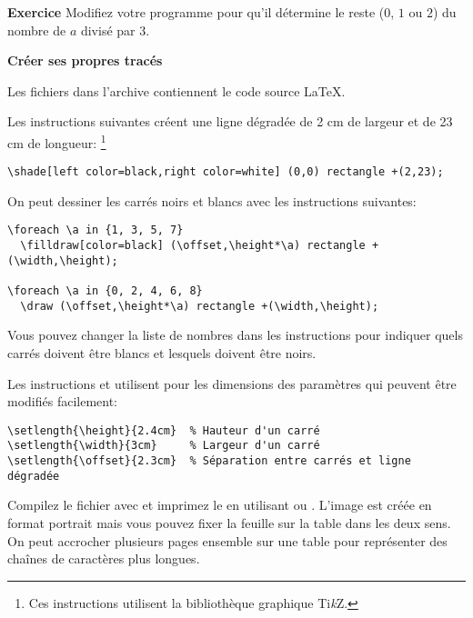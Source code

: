\textbf{Exercice}
Modifiez votre programme pour qu'il détermine le reste ($0$, $1$ ou $2$)
du nombre de $a$ divisé par $3$.

\bigskip

\textbf{Créer ses propres tracés}


Les fichiers  dans l'archive contiennent le code source \LaTeX{}.

Les instructions suivantes créent une ligne dégradée de 2 cm de largeur et de 23 cm de longueur:
\footnote{Ces instructions utilisent la bibliothèque graphique Ti\textit{k}Z.}
\begin{footnotesize}
\begin{verbatim}
\shade[left color=black,right color=white] (0,0) rectangle +(2,23);
\end{verbatim}
\end{footnotesize}

On peut dessiner les carrés noirs et blancs avec les instructions suivantes:
\begin{footnotesize}
\begin{verbatim}
\foreach \a in {1, 3, 5, 7}
  \filldraw[color=black] (\offset,\height*\a) rectangle +(\width,\height);

\foreach \a in {0, 2, 4, 6, 8}
  \draw (\offset,\height*\a) rectangle +(\width,\height);
\end{verbatim}
\end{footnotesize}

Vous pouvez changer la liste de nombres dans les instructions 
pour indiquer quels carrés doivent être blancs et lesquels doivent être noirs.

Les instructions  et  utilisent pour les dimensions des paramètres
qui peuvent être modifiés facilement:
\begin{footnotesize}
\begin{verbatim}
\setlength{\height}{2.4cm}  % Hauteur d'un carré
\setlength{\width}{3cm}     % Largeur d'un carré
\setlength{\offset}{2.3cm}  % Séparation entre carrés et ligne dégradée
\end{verbatim}
\end{footnotesize}

Compilez le fichier avec  et imprimez le en utilisant  ou .
L'image est créée en format portrait mais vous pouvez fixer la feuille sur la table dans les deux sens.
On peut accrocher plusieurs pages ensemble sur une table pour représenter des chaînes de caractères plus longues.
